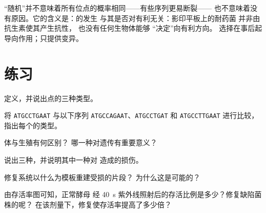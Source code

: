 \begin{remark}[再谈随机性]\label{rem:g11:mutations:random}
“随机”并不意味着所有位点的概率相同——有些序列更易断裂——
也不意味着没有原因。它的含义是：的发生
与其是否对有利无关：影印平板上的耐药菌
并非由抗生素使其产生抗性，
也没有任何生物体能够
“决定”向有利方向。
选择在事后起导向作用；只提供变异。
\end{remark}

\section{练习}

\begin{exercise}[$\star$]\label{exo:g11:mutations:1}
定义，并说出点的三种类型。
\end{exercise}

\begin{exercise}[$\star$]\label{exo:g11:mutations:2}
将 \texttt{ATGCCTGAAT} 与以下序列
\texttt{ATGCCAGAAT}、\texttt{ATGCCTGAT} 和 \texttt{ATGCCTTGAAT} 进行比较，指出每个的类型。
\end{exercise}

\begin{exercise}[$\star$]\label{exo:g11:mutations:3}
体与生殖有何区别？
哪一种对遗传有重要意义？
\end{exercise}

\begin{exercise}[$\star$]\label{exo:g11:mutations:4}
说出三种，并说明其中一种对  造成的损伤。
\end{exercise}

\begin{exercise}[$\star$]\label{exo:g11:mutations:5}
修复系统以什么为模板重建受损的片段？
为什么这是可能的？
\end{exercise}

\begin{exercise}[$\star\star$]\label{exo:g11:mutations:6}
由存活率图可知，正常酵母
经 \qty{40}{s} 紫外线照射后的存活比例是多少？修复缺陷菌株的呢？
在该剂量下，修复使存活率提高了多少倍？
\end{exercise}

